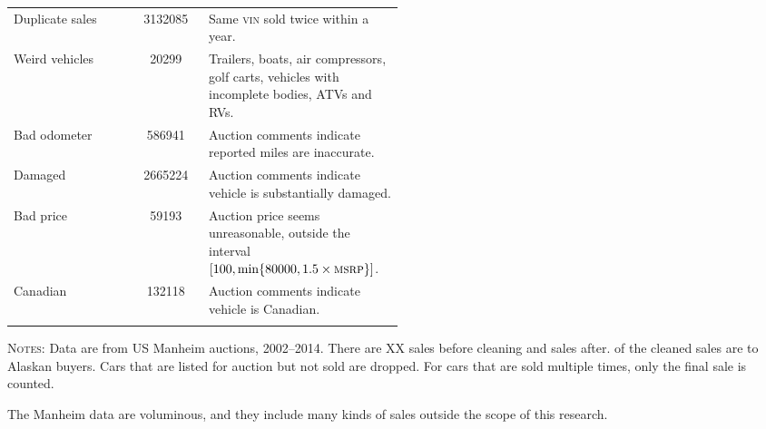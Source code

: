\documentclass[11pt,letterpaper,oneside]{article}
\newcommand{\snippet}[1]{\hspace{-0.15em}}
\begin{document}
\begin{table}[hbtp]
\begin{tabular}{l S p{0.5\linewidth}}
    Duplicate sales & 3132085 & Same \textsc{vin} sold twice within a year.\\
    \addlinespace
	Weird vehicles & 20299 & Trailers, boats, air compressors, golf carts, vehicles with incomplete bodies, ATVs and RVs.\\
	\addlinespace
    Bad odometer & 586941 & Auction comments indicate reported miles are inaccurate.\\
	\addlinespace
    Damaged & 2665224 & Auction comments indicate vehicle is substantially damaged. \\
	\addlinespace
    Bad price & 59193 & Auction price seems unreasonable, outside the interval $[100, \min\{80000, 1.5\times \textsc{msrp} \}]$.\\
	\addlinespace
    Canadian & 132118 & Auction comments indicate vehicle is Canadian.\\
    \bottomrule
    \addlinespace
\end{tabular}
\footnotesize
\textsc{Notes:} Data are from US Manheim auctions, 2002--2014.
There are XX sales before cleaning and \snippet{auctions_cleaned_total_obs_count.tex} sales after.
\snippet{auctions_cleaned_alaska_obs_count.tex} of the cleaned sales are to Alaskan buyers.
Cars that are listed for auction but not sold are dropped.
For cars that are sold multiple times, only the final sale is counted.

\end{table}


The Manheim data are voluminous, and they include many kinds of sales outside the scope of this research.
\end{document}
